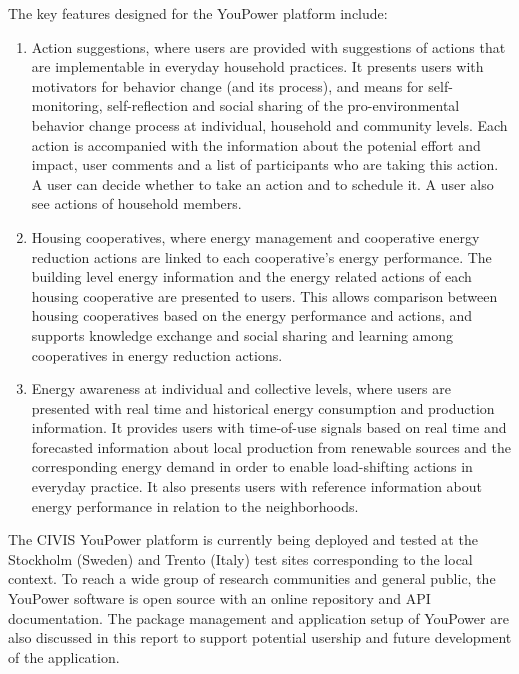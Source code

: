 The key features designed for the YouPower platform include: 

\begin{enumerate}
\item Action suggestions, where users are provided with suggestions of actions that are implementable in everyday household practices. 
% 
It presents users with motivators for behavior change (and its process), and means for self-monitoring, self-reflection and social sharing of the pro-environmental behavior change process at individual, household and community levels. 
Each action is accompanied with the information about the potenial effort and impact, user comments and a list of participants who are taking this action. A user can decide whether to take an action and to schedule it. A user also see actions of household members. 

\item Housing cooperatives, where energy management and cooperative energy reduction actions are linked to each cooperative's energy performance. 
% 
The building level energy information and the energy related actions of each housing cooperative are presented to users. This allows comparison between housing cooperatives based on the energy performance and actions, and supports knowledge exchange and social sharing and learning among cooperatives in energy reduction actions.

\item Energy awareness at individual and collective levels, where users are presented with real time and historical energy consumption and production information. 
% 
It provides users with time-of-use signals based on real time and forecasted information about local production from renewable sources and the corresponding energy demand in order to enable load-shifting actions in everyday practice. It also presents users with reference information about energy performance in relation to the neighborhoods. 

\end{enumerate}

The CIVIS YouPower platform is currently being deployed and tested at the Stockholm (Sweden) and Trento (Italy)
test sites corresponding to the local context. To reach a wide group of research communities and general public, the YouPower software is open source with an online repository and API documentation. The package management and application setup of YouPower are also discussed in this report to support potential usership and future development of the application. 

